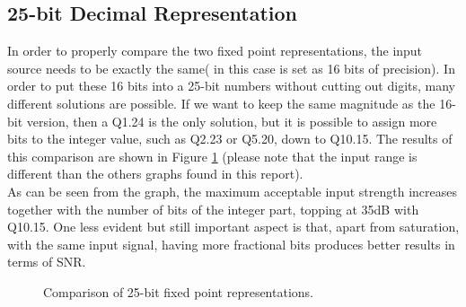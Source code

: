\documentclass[a4paper]{article}
\begin{document}
\subsection{25-bit Decimal Representation}
\label{25BIT}
In order to properly compare the two fixed point representations, the input source needs to be exactly the same( in this case is set as 16 bits of precision). In order to put these 16 bits into a 25-bit numbers without cutting out digits, many different solutions are possible. If we want to keep the same magnitude as the 16-bit version, then a Q1.24 is the only solution, but it is possible to assign more bits to the integer value, such as Q2.23 or Q5.20, down to Q10.15. The results of this comparison are shown in Figure \ref{Fig:25bit} (please note that the input range is different than the others graphs found in this report).\\

As can be seen from the graph, the maximum acceptable input strength increases together with the number of bits of the integer part, topping at 35dB with Q10.15. One less evident but still important aspect is that, apart from saturation, with the same input signal, having more fractional bits produces better results in terms of SNR.

\begin{figure}
	\centering
	\resizebox{1.0\textwidth}{!}{}
	\caption{Comparison of 25-bit fixed point representations.}
	\label{Fig:25bit}
\end{figure}
\end{document}
